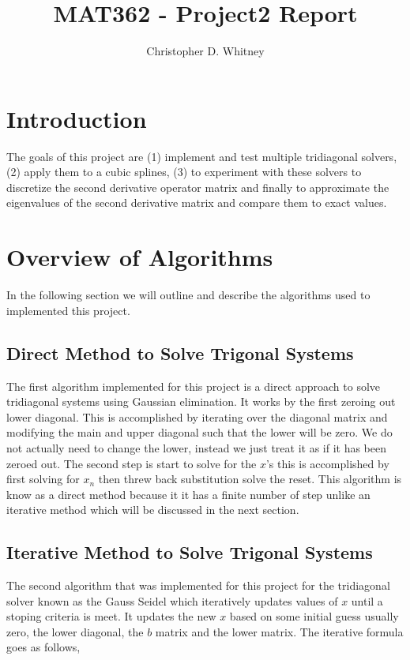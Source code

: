 \documentclass{article}
\begin{document}
\title{MAT362 - Project2 Report}
\author{Christopher D. Whitney}

\maketitle

\section*{Introduction}
The goals of this project are (1) implement and test multiple tridiagonal solvers, (2) apply them to a cubic splines, (3) to experiment with these solvers to discretize the second derivative operator matrix and finally to approximate the eigenvalues of the second derivative matrix and compare them to exact values. 

\section*{Overview of Algorithms}
In the following section we will outline and describe the algorithms used to implemented this project. 

\subsection*{Direct Method to Solve Trigonal Systems}
The first algorithm implemented for this project is a direct approach to solve tridiagonal systems using Gaussian elimination. It works by the first zeroing out lower diagonal. This is accomplished by iterating over the diagonal matrix and modifying the main and upper diagonal such that the lower will be zero. We do not actually need to change the lower, instead we just treat it as if it has been zeroed out. The second step is start to solve for the $x$'s this is accomplished by first solving for $x_n$ then threw back substitution solve the reset. This algorithm is know as a direct method because it it has a finite number of step unlike an iterative method which will be discussed in the next section. 

\subsection*{Iterative Method to Solve Trigonal Systems}
The second algorithm that was implemented for this project for the tridiagonal solver known as the Gauss Seidel which iteratively updates values of $x$ until a stoping criteria is meet. It updates the new $x$ based on some initial guess usually zero, the lower diagonal, the $b$ matrix and the lower matrix. The iterative formula goes as follows, 
\end{document}
